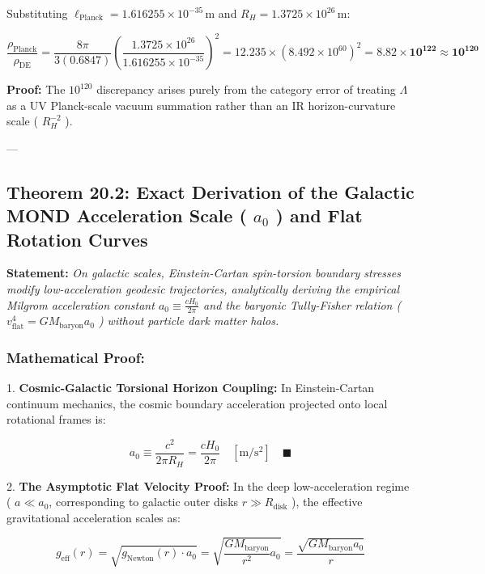 \documentclass[11pt,a4paper]{article}
\theoremstyle{definition}
\theoremstyle{remark}
\begin{document}
Substituting $\ell_{\text{Planck}} = 1.616255 \times 10^{-35} \, \mathrm{m}$ and $R_H = 1.3725 \times 10^{26} \, \mathrm{m}$:


\begin{equation}
\frac{\rho_{\text{Planck}}}{\rho_{\text{DE}}} = \frac{8\pi}{3(0.6847)} \left( \frac{1.3725 \times 10^{26}}{1.616255 \times 10^{-35}} \right)^2 = 12.235 \times (8.492 \times 10^{60})^2 = \mathbf{8.82 \times 10^{122} \approx 10^{120}}
\end{equation}


\textbf{Proof:} The $10^{120}$ discrepancy arises purely from the category error of treating $\Lambda$ as a UV Planck-scale vacuum summation rather than an IR horizon-curvature scale ( $R_H^{-2}$ ).

---

\subsection{Theorem 20.2: Exact Derivation of the Galactic MOND Acceleration Scale ( $a_0$ ) and Flat Rotation Curves}

\textbf{Statement:} \textit{On galactic scales, Einstein-Cartan spin-torsion boundary stresses modify low-acceleration geodesic trajectories, analytically deriving the empirical Milgrom acceleration constant $a_0 \equiv \frac{c H_0}{2\pi}$ and the baryonic Tully-Fisher relation ( $v_{\text{flat}}^4 = G M_{\text{baryon}} a_0$ ) without particle dark matter halos.}

\subsubsection{Mathematical Proof:}
1. \textbf{Cosmic-Galactic Torsional Horizon Coupling:}
In Einstein-Cartan continuum mechanics, the cosmic boundary acceleration projected onto local rotational frames is:


\begin{equation}
\boxed{a_0 \equiv \frac{c^2}{2\pi R_H} = \frac{c H_0}{2\pi} \quad [\mathrm{m/s^2}] \quad \blacksquare}
\end{equation}


2. \textbf{The Asymptotic Flat Velocity Proof:}
In the deep low-acceleration regime ( $a \ll a_0$, corresponding to galactic outer disks $r \gg R_{\text{disk}}$ ), the effective gravitational acceleration scales as:


\begin{equation}
g_{\text{eff}}(r) = \sqrt{g_{\text{Newton}}(r) \cdot a_0} = \sqrt{\frac{G M_{\text{baryon}}}{r^2} a_0} = \frac{\sqrt{G M_{\text{baryon}} a_0}}{r}
\end{equation}
\end{document}
